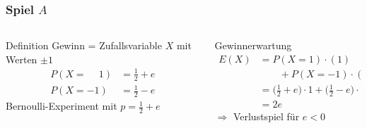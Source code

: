 %
%
%
\bgroup
\begin{frame}[t]
\setlength{\abovedisplayskip}{5pt}
\setlength{\belowdisplayskip}{5pt}
\frametitle{Spiel $A$}
\vspace{-20pt}
\begin{columns}[t,onlytextwidth]
\begin{column}{0.48\textwidth}
\begin{block}{Definition}
Gewinn = Zufallsvariable $X$ mit Werten $\pm 1$
\begin{align*}
P(X=\phantom{+}1)
&=
\frac12+e
\\
P(X=         - 1)
&=
\frac12-e
\end{align*}
Bernoulli-Experiment mit $p=\frac12+e$
\end{block}
\end{column}
\begin{column}{0.48\textwidth}
\begin{block}{Gewinnerwartung}
\begin{align*}
E(X)
&=
P(X=1)\cdot (1)
\\
&\qquad
+
P(X=-1)\cdot (-1)
\\
&=
\biggl(\frac12+e\biggr)\cdot 1
+
\biggl(\frac12-e\biggr)\cdot (-1)
\\
&=2e
\end{align*}
$\Rightarrow$ {Verlustspiel für $e<0$}
\end{block}
\end{column}
\end{columns}
\end{frame}
\egroup
